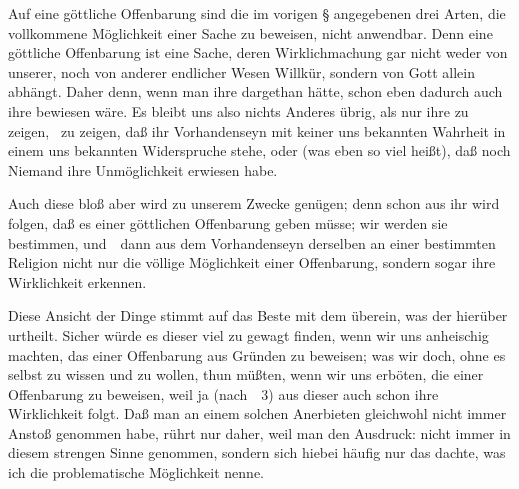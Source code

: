 \begin{aufza}
\item Auf eine göttliche Offenbarung sind die im vorigen § angegebenen drei Arten, die vollkommene Möglichkeit einer Sache zu beweisen, nicht anwendbar. Denn eine göttliche Offenbarung ist eine Sache, deren Wirklichmachung gar nicht weder von unserer, noch von anderer endlicher Wesen Willkür, sondern von Gott allein abhängt. Daher denn, wenn man ihre  dargethan hätte, schon eben dadurch auch ihre  bewiesen wäre. Es bleibt uns also nichts Anderes übrig, als nur ihre  zu zeigen, \dh\ zu zeigen, daß ihr Vorhandenseyn mit keiner uns bekannten Wahrheit in einem uns bekannten Widerspruche stehe, oder (was eben so viel heißt), daß noch Niemand ihre Unmöglichkeit erwiesen habe.
\item Auch diese bloß  aber wird zu unserem Zwecke genügen; denn schon aus ihr wird folgen, daß es  einer göttlichen Offenbarung geben müsse; wir werden sie bestimmen, und~\ dann aus dem Vorhandenseyn derselben an einer bestimmten Religion nicht nur die völlige Möglichkeit einer Offenbarung, sondern sogar ihre Wirklichkeit erkennen.
\end{aufza}
\begin{RWanm}
Diese Ansicht der Dinge stimmt auf das Beste mit dem überein, was der  hierüber urtheilt. Sicher würde es dieser viel zu gewagt finden, wenn wir uns anheischig machten, das  einer Offenbarung aus Gründen  zu beweisen; was wir doch, ohne es selbst zu wissen und zu wollen, thun müßten, wenn wir uns erböten, die  einer Offenbarung zu beweisen, weil ja (nach \ \no\,3) aus dieser auch schon ihre Wirklichkeit folgt. Daß man an einem solchen Anerbieten gleichwohl nicht immer Anstoß genommen habe, rührt nur daher, weil man den Ausdruck:  nicht immer in diesem strengen Sinne genommen, sondern sich hiebei häufig nur das dachte, was ich die problematische Möglichkeit nenne.
\end{RWanm}

